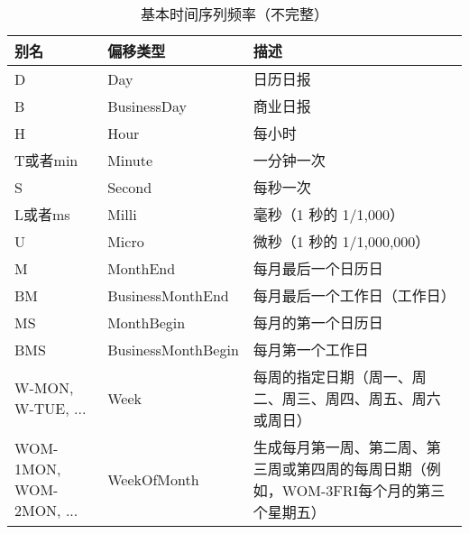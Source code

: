 \begin{table}
    \centering
    \caption{基本时间序列频率（不完整）}
    \label{tab11.4}
    \begin{tabularx}{\textwidth}{llX}
        \hline
        别名                      & 偏移类型                 & 描述                                                                   \\
        \hline
        D                       & Day                  & 日历日报                                                                 \\
        B                       & BusinessDay          & 商业日报                                                                 \\
        H                       & Hour                 & 每小时                                                                  \\
        T或者min                  & Minute               & 一分钟一次                                                                \\
        S                       & Second               & 每秒一次                                                                 \\
        L或者ms                   & Milli                & 毫秒（1 秒的 1/1,000）                                                     \\
        U                       & Micro                & 微秒（1 秒的 1/1,000,000）                                                 \\
        M                       & MonthEnd             & 每月最后一个日历日                                                            \\
        BM                      & BusinessMonthEnd     & 每月最后一个工作日（工作日）                                                       \\
        MS                      & MonthBegin           & 每月的第一个日历日                                                            \\
        BMS                     & BusinessMonthBegin   & 每月第一个工作日                                                             \\
        W-MON, W-TUE, ...       & Week                 & 每周的指定日期（周一、周二、周三、周四、周五、周六或周日）                                        \\
        WOM-1MON, WOM-2MON, ... & WeekOfMonth          & 生成每月第一周、第二周、第三周或第四周的每周日期（例如，WOM-3FRI每个月的第三个星期五）                      \\

\end{tabularx}
\end{table}
